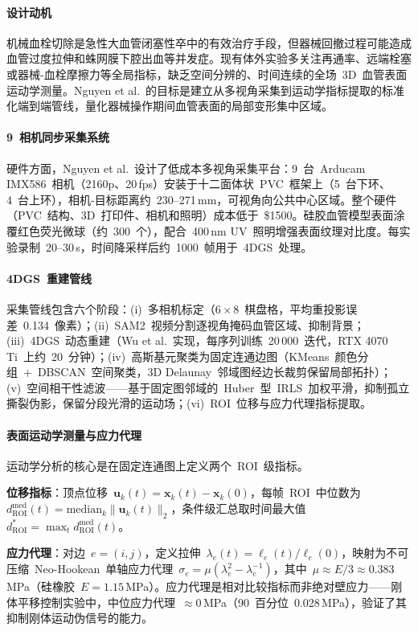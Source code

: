 \paragraph{设计动机}
机械血栓切除是急性大血管闭塞性卒中的有效治疗手段，但器械回撤过程可能造成血管过度拉伸和蛛网膜下腔出血等并发症。现有体外实验多关注再通率、远端栓塞或器械-血栓摩擦力等全局指标，缺乏空间分辨的、时间连续的全场~3D~血管表面运动学测量。Nguyen et al.~的目标是建立从多视角采集到运动学指标提取的标准化端到端管线，量化器械操作期间血管表面的局部变形集中区域。

\paragraph{9~相机同步采集系统}
硬件方面，Nguyen et al.~设计了低成本多视角采集平台：9~台~Arducam IMX586~相机（2160p、20\,fps）安装于十二面体状~PVC~框架上（5~台下环、4~台上环），相机-目标距离约~230--271\,mm，可视角向公共中心区域。整个硬件（PVC~结构、3D~打印件、相机和照明）成本低于~\$1500。硅胶血管模型表面涂覆红色荧光微球（约~300~个），配合~400\,nm UV~照明增强表面纹理对比度。每实验录制~20--30\,s，时间降采样后约~1000~帧用于~4DGS~处理。

\paragraph{4DGS~重建管线}
采集管线包含六个阶段：(i)~多相机标定（$6\times8$~棋盘格，平均重投影误差~0.134~像素）；(ii)~SAM2~视频分割逐视角掩码血管区域、抑制背景；(iii)~4DGS~动态重建（Wu et al.~实现，每序列训练~20\,000~迭代，RTX 4070 Ti~上约~20~分钟）；(iv)~高斯基元聚类为固定连通边图（KMeans~颜色分组~+~DBSCAN~空间聚类，3D Delaunay~邻域图经边长裁剪保留局部拓扑）；(v)~空间相干性滤波——基于固定图邻域的~Huber~型~IRLS~加权平滑，抑制孤立撕裂伪影，保留分段光滑的运动场；(vi)~ROI~位移与应力代理指标提取。

\paragraph{表面运动学测量与应力代理}
运动学分析的核心是在固定连通图上定义两个~ROI~级指标。

\textbf{位移指标}：顶点位移~$\mathbf{u}_k(t) = \mathbf{x}_k(t) - \mathbf{x}_k(0)$，每帧~ROI~中位数为~$d^{\text{med}}_{\text{ROI}}(t) = \text{median}_k \|\mathbf{u}_k(t)\|_2$，条件级汇总取时间最大值~$d^{*}_{\text{ROI}} = \max_t d^{\text{med}}_{\text{ROI}}(t)$。

\textbf{应力代理}：对边~$e=(i,j)$，定义拉伸~$\lambda_e(t) = \ell_e(t)/\ell_e(0)$，映射为不可压缩~Neo-Hookean~单轴应力代理~$\sigma_e = \mu(\lambda_e^2 - \lambda_e^{-1})$，其中~$\mu \approx E/3 \approx 0.383$\,MPa（硅橡胶~$E=1.15$\,MPa）。应力代理是相对比较指标而非绝对壁应力——刚体平移控制实验中，中位应力代理~$\approx 0$\,MPa（90~百分位~0.028\,MPa），验证了其抑制刚体运动伪信号的能力。

